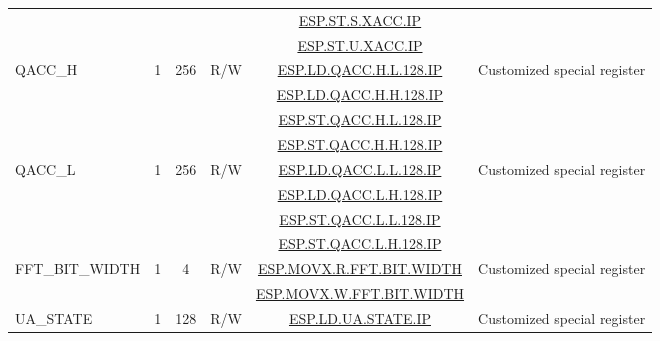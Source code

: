 \begin{ThreePartTable}
\begin{longtable}[c]{|l|c|c|c|c|l|}
& & & &  \hyperref[instruction:ESPSTSXACCIP]{ESP.ST.S.XACC.IP} & \\\cline{5-5}

& & & &  \hyperref[instruction:ESPSTUXACCIP]{ESP.ST.U.XACC.IP} & \\\hline

    \multirow{4}{*}{QACC\_H} & \multirow{4}{*}{1} & \multirow{4}{*}{256} & \multirow{4}{*}{R/W} & \hyperref[instruction:ESPLDQACC_HL128IP]{ESP.LD.QACC.H.L.128.IP}  & \multirow{4}{*}{Customized special register} \\\cline{5-5}

& & & &  \hyperref[instruction:ESPLDQACC_HH128IP]{ESP.LD.QACC.H.H.128.IP} & \\\cline{5-5}

& & & &  \hyperref[instruction:ESPSTQACC_HL128IP]{ESP.ST.QACC.H.L.128.IP} & \\\cline{5-5}

& & & &  \hyperref[instruction:ESPSTQACC_HH128IP]{ESP.ST.QACC.H.H.128.IP} & \\\hline


    \multirow{4}{*}{QACC\_L} & \multirow{4}{*}{1} & \multirow{4}{*}{256} & \multirow{4}{*}{R/W} & \hyperref[instruction:ESPLDQACC_LL128IP]{ESP.LD.QACC.L.L.128.IP} & \multirow{4}{*}{Customized special register} \\\cline{5-5}

& & & &  \hyperref[instruction:ESPLDQACC_LH128IP]{ESP.LD.QACC.L.H.128.IP} & \\\cline{5-5}

& & & &  \hyperref[instruction:ESPSTQACC_LL128IP]{ESP.ST.QACC.L.L.128.IP} & \\\cline{5-5}

& & & &  \hyperref[instruction:ESPSTQACC_LH128IP]{ESP.ST.QACC.L.H.128.IP} & \\\hline

    \multirow{2}{*}{FFT\_BIT\_WIDTH} & \multirow{2}{*}{1} & \multirow{2}{*}{4} & \multirow{2}{*}{R/W} & \hyperref[instruction:ESPMOVXRFFT_BIT_WIDTH]{ESP.MOVX.R.FFT.BIT.WIDTH} & \multirow{2}{*}{Customized special register} \\\cline{5-5}

   & & & &  \hyperref[instruction:ESPMOVXWFFT_BIT_WIDTH]{ESP.MOVX.W.FFT.BIT.WIDTH} & \\\hline

    \multirow{2}{*}{UA\_STATE} & \multirow{2}{*}{1} & \multirow{2}{*}{128} & \multirow{2}{*}{R/W} & \hyperref[instruction:ESPLDUA_STATEIP]{ESP.LD.UA.STATE.IP} &\multirow{2}{*}{Customized special register} \\\cline{5-5}


\end{longtable}
\end{ThreePartTable}
